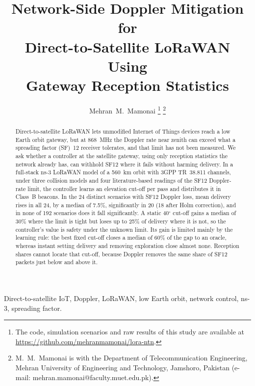 \documentclass[journal]{IEEEtran}
\begin{document}
\title{Network-Side Doppler Mitigation for\\ Direct-to-Satellite LoRaWAN Using\\ Gateway Reception Statistics}

\author{Mehran~M.~Mamonai%
\thanks{The code, simulation scenarios and raw results of this study are available at \protect\url{https://github.com/mehranmamonai/lora-ntn}.}%
\thanks{M.~M.~Mamonai is with the Department of Telecommunication Engineering, Mehran University of Engineering and Technology, Jamshoro, Pakistan (e-mail: mehran.mamonai@faculty.muet.edu.pk).}}


\maketitle

\begin{abstract}
Direct-to-satellite LoRaWAN lets unmodified Internet of Things devices reach a low Earth orbit gateway, but at 868~MHz the Doppler rate near zenith can exceed what a spreading factor (SF)~12 receiver tolerates, and that limit has not been measured. We ask whether a controller at the satellite gateway, using only reception statistics the network already has, can withhold SF12 where it fails without harming delivery. In a full-stack ns-3 LoRaWAN model of a 560~km orbit with 3GPP TR~38.811 channels, under three collision models and four literature-based readings of the SF12 Doppler-rate limit, the controller learns an elevation cut-off per pass and distributes it in Class~B beacons. In the 24 distinct scenarios with SF12 Doppler loss, mean delivery rises in all 24, by a median of 7.5\%, significantly in 20 (18 after Holm correction), and in none of 192 scenarios does it fall significantly. A static 40$^\circ$ cut-off gains a median of 30\% where the limit is tight but loses up to 25\% of delivery where it is not, so the controller's value is safety under the unknown limit. Its gain is limited mainly by the learning rule: the best fixed cut-off closes a median of 60\% of the gap to an oracle, whereas instant setting delivery and removing exploration close almost none. Reception shares cannot locate that cut-off, because Doppler removes the same share of SF12 packets just below and above it.
\end{abstract}

\begin{IEEEkeywords}
Direct-to-satellite IoT, Doppler, LoRaWAN, low Earth orbit, network control, ns-3, spreading factor.
\end{IEEEkeywords}
\end{document}
